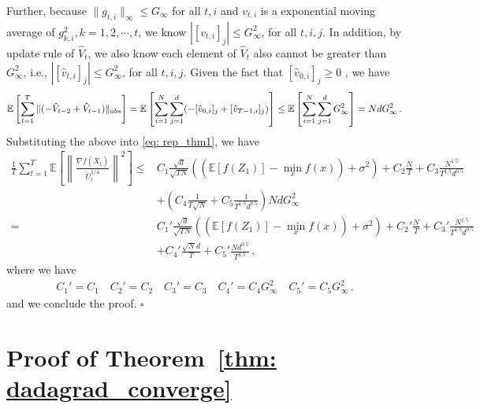 \documentclass[11pt]{article}
\begin{document}
Further, because $\|g_{t,i}\|_{\infty} \leq G_{\infty}$ for all $t,i$ and $v_{t,i}$ is a exponential moving average of $g_{k,i}^2, k=1,2,\cdots,t$, we know $|[v_{t,i}]_j| \leq G^2_{\infty}$, for all $t,i,j$. In addition, by update rule of $\hat V_t$, we also know each element of $\hat V_{t}$ also cannot be greater than $G^2_{\infty}$, i.e., $|[\hat v_{t,i}]_j| \leq G^2_{\infty}$, for all $t,i,j$. 
Given the fact that $[\hat v_{0,i}]_j \geq 0$ , we have 
\begin{align}\notag
\mathbb E \left[ \sum_{t=1}^{T}   \|    (- \hat V_{t-2} + \hat V_{t-1} ) \|_{abs} \right]  = \mathbb E \left[   \sum_{i=1}^N \sum_{j=1}^d    (- [\hat v_{0,i}]_j + [\hat v_{T-1,i}]_j ) \right]  
\leq  \mathbb E \left[   \sum_{i=1}^N \sum_{j=1}^d  G_{\infty}^2   \right] =  Nd G_{\infty}^2 \, .
\end{align}
Substituting the above into \eqref{eq: rep_thm1}, we have 
\begin{align}\label{eq: sub_thm1}
	 \frac{1}{T}\sum_{t=1}^T  \mathbb E \left [\left\|\frac{\nabla f( \overline X_{t})}{\overline U_{t}^{1/4}}\right\|^2  \right] 
	\leq  & C_1 \frac{\sqrt{d}}{\sqrt{TN}} \left(( \mathbb E  [f( Z_{1})]  -  \min_x  f(x)) +    \sigma^2 \right)  +  C_2 \frac{N}{T}  +  C_3 \frac{N^{1.5}}{T^{1.5}d^{0.5}} \nonumber
	 \\
    &+  \left(C_4 \frac{1}{T\sqrt{N}} +  C_5   \frac{1}{T^{1.5}d^{0.5}}\right)NdG_{\infty}^2  \nonumber \\
    =  & C_1' \frac{\sqrt{d}}{\sqrt{TN}} \left(( \mathbb E  [f( Z_{1})]  -  \min_x  f(x)) +    \sigma^2 \right)  +  C_2' \frac{N}{T}  +  C_3' \frac{N^{1.5}}{T^{1.5}d^{0.5}} 
	 \nonumber \\
    &+  C_4' \frac{\sqrt{N}d}{T} +  C_5'  \frac{Nd^{0.5}}{T^{1.5}}\,,
\end{align}
where we have 
\begin{align}
C_1' = C_1 \quad C_2' = C_2 \quad C_3' = C_3 \quad C_4' = C_4G_{\infty}^2 \quad C_5' = C_5 G_{\infty}^2 \, .
\end{align}
and we conclude the proof. \hfill $\square$




\vspace{0.2in}

\section{Proof of Theorem~\ref{thm: dadagrad_converge}} \label{app: proof_adagrad}
\end{document}
